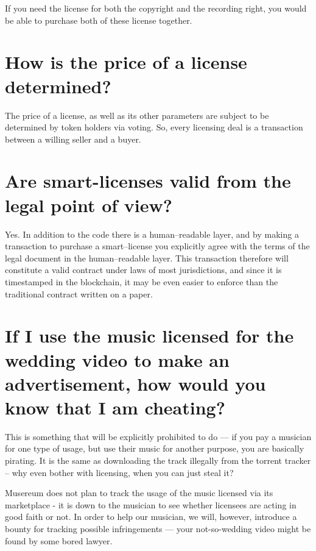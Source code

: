 \documentclass[12pt]{report}
\begin{document}
If you need the license for both the copyright and the recording right,
you would be able to purchase both of these license together.

\section{How is the price of a license determined?}
\label{licenses-price}
The price of a license, as well as its other parameters are subject to be
determined by token holders via voting. So, every licensing deal is a
transaction between a willing seller and a buyer.

\section{Are smart-licenses valid from the legal point of view?}
\label{licenses-legal}
Yes. In addition to the code there is a human–readable layer, and by
making a transaction to purchase a smart–license you explicitly agree
with the terms of the legal document in the human–readable layer.
This transaction therefore will constitute a valid contract under laws
of most jurisdictions, and since it is timestamped in the blockchain,
it may be even easier to enforce than the traditional contract written
on a paper.

\section{If I use the music licensed for the wedding video to make an advertisement, how would you know that I am cheating?}
This is something that will be explicitly prohibited to do — if you pay
a musician for one type of usage, but use their music for another
purpose, you are basically pirating. It is the same as downloading the
track illegally from the torrent tracker – why even bother with
licensing, when you can just steal it?

Musereum does not plan to track the usage of the music licensed via
its marketplace - it is down to the musician to see whether licensees
are acting in good faith or not. In order to help our musician, we will,
however, introduce a bounty for tracking possible infringements —
your not-so-wedding video might be found by some bored lawyer.
\end{document}
